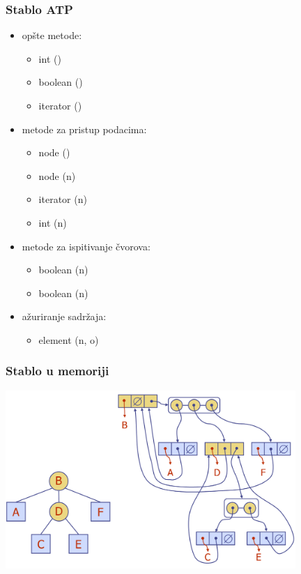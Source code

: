 \documentclass[compress,aspectratio=169]{beamer}
\begin{document}
\begin{frame}[fragile]
  \frametitle{Stablo ATP}
  \begin{itemize}
    \item opšte metode:
    \begin{itemize}
      \item int ()
      \item boolean ()
      \item iterator ()
    \end{itemize}
    \item metode za pristup podacima:
    \begin{itemize}
      \item node ()
      \item node (n)
      \item iterator (n)
      \item int (n)
    \end{itemize}
    \item metode za ispitivanje čvorova:
    \begin{itemize}
      \item boolean (n)
      \item boolean (n)
    \end{itemize}
    \item ažuriranje sadržaja:
    \begin{itemize}
      \item element (n, o)
    \end{itemize}
  \end{itemize}
\end{frame}

\begin{frame}[fragile]
  \frametitle{Stablo u memoriji}
\begin{center}
  \includegraphics[width=11cm]{asp-08-pic11.png}
\end{center}
\end{frame}
\end{document}
